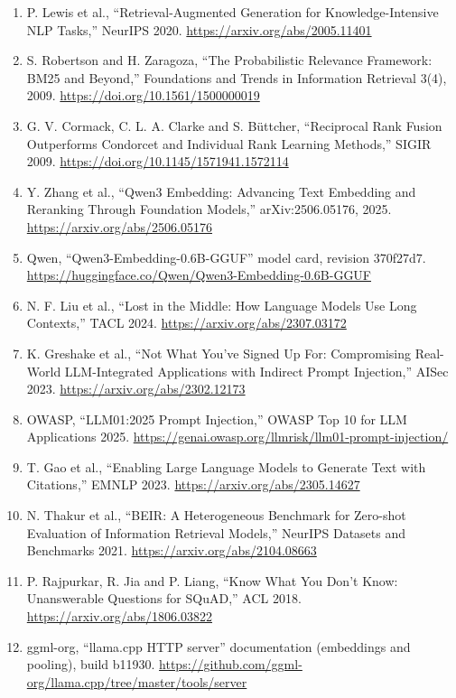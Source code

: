 \documentclass[11pt,a4paper]{article}
\begin{document}
\begin{enumerate}
\item P. Lewis et al., ``Retrieval-Augmented Generation for Knowledge-Intensive NLP Tasks,'' NeurIPS 2020. \url{https://arxiv.org/abs/2005.11401}
\item S. Robertson and H. Zaragoza, ``The Probabilistic Relevance Framework: BM25 and Beyond,'' Foundations and Trends in Information Retrieval 3(4), 2009. \url{https://doi.org/10.1561/1500000019}
\item G. V. Cormack, C. L. A. Clarke and S. B\"uttcher, ``Reciprocal Rank Fusion Outperforms Condorcet and Individual Rank Learning Methods,'' SIGIR 2009. \url{https://doi.org/10.1145/1571941.1572114}
\item Y. Zhang et al., ``Qwen3 Embedding: Advancing Text Embedding and Reranking Through Foundation Models,'' arXiv:2506.05176, 2025. \url{https://arxiv.org/abs/2506.05176}
\item Qwen, ``Qwen3-Embedding-0.6B-GGUF'' model card, revision 370f27d7. \url{https://huggingface.co/Qwen/Qwen3-Embedding-0.6B-GGUF}
\item N. F. Liu et al., ``Lost in the Middle: How Language Models Use Long Contexts,'' TACL 2024. \url{https://arxiv.org/abs/2307.03172}
\item K. Greshake et al., ``Not What You've Signed Up For: Compromising Real-World LLM-Integrated Applications with Indirect Prompt Injection,'' AISec 2023. \url{https://arxiv.org/abs/2302.12173}
\item OWASP, ``LLM01:2025 Prompt Injection,'' OWASP Top 10 for LLM Applications 2025. \url{https://genai.owasp.org/llmrisk/llm01-prompt-injection/}
\item T. Gao et al., ``Enabling Large Language Models to Generate Text with Citations,'' EMNLP 2023. \url{https://arxiv.org/abs/2305.14627}
\item N. Thakur et al., ``BEIR: A Heterogeneous Benchmark for Zero-shot Evaluation of Information Retrieval Models,'' NeurIPS Datasets and Benchmarks 2021. \url{https://arxiv.org/abs/2104.08663}
\item P. Rajpurkar, R. Jia and P. Liang, ``Know What You Don't Know: Unanswerable Questions for SQuAD,'' ACL 2018. \url{https://arxiv.org/abs/1806.03822}
\item ggml-org, ``llama.cpp HTTP server'' documentation (embeddings and pooling), build b11930. \url{https://github.com/ggml-org/llama.cpp/tree/master/tools/server}
\end{enumerate}
\end{document}
